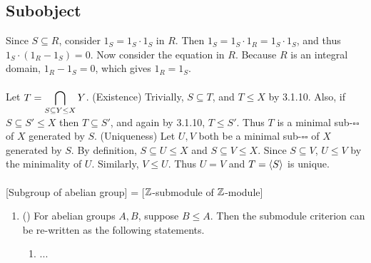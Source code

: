 \subsection{Subobject}

 Since $S\subseteq R$, consider $1_S = 1_S\cdot 1_S$ in $R$. Then $1_S = 1_S\cdot 1_R = 1_S\cdot 1_S$, and thus $1_S\cdot (1_R-1_S) = 0$. Now consider the equation in $R$. Because $R$ is an integral domain, $1_R - 1_S = 0$, which gives $1_R = 1_S$.\\
\\
 Let $T = \displaystyle \bigcap_{S\subseteq Y \leq X} Y$. (Existence) Trivially, $S\subseteq T$, and $T\leq X$ by 3.1.10. Also, if $S\subseteq S'\leq X$ then $T\subseteq S'$, and again by 3.1.10, $T\leq S'$. Thus $T$ is a minimal sub-$\square\square$ of $X$ generated by $S$. (Uniqueness) Let $U, V$ both be a minimal sub-$\square\square$ of $X$ generated by $S$. By definition, $S\subseteq U\leq X$ and $S\subseteq V\leq X$. Since $S\subseteq V$, $U\leq V$ by the minimality of $U$. Similarly, $V\leq U$. Thus $U = V$ and $T=\left\langle S \right\rangle$ is unique.\\
\\
 [Subgroup of abelian group] = [$\mathbb{Z}$-submodule of $\mathbb{Z}$-module]
\begin{enumerate}
	\item (\mimp) For abelian groups $A, B$, suppose $B\leq A$. Then the submodule criterion can be re-written as the following statements.
	\begin{enumerate}
		\item ...
	\end{enumerate}
\end{enumerate}
\pagebreak